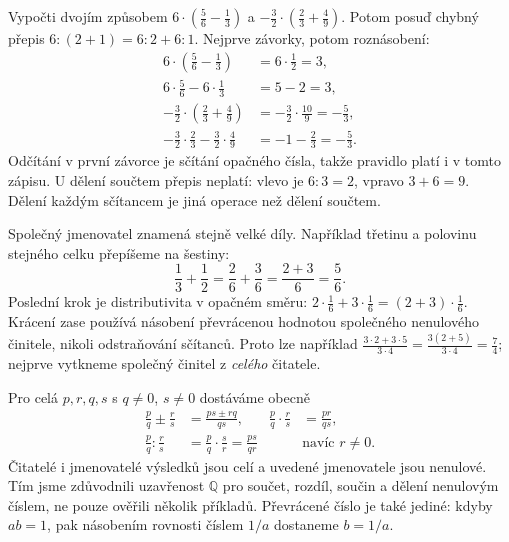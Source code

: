 \documentclass[11pt,a4paper]{article}
\begin{document}
\begin{prikladReseniBox}[title={Příklad 4},breakable=false]
Vypočti dvojím způsobem $6\cdot(\frac56-\frac13)$ a
$-\frac32\cdot(\frac23+\frac49)$. Potom posuď chybný přepis
$6:(2+1)=6:2+6:1$.
\tcblower
Nejprve závorky, potom roznásobení:
\begin{align*}
6\cdot\left(\frac56-\frac13\right)&=6\cdot\frac12=3,\\
6\cdot\frac56-6\cdot\frac13&=5-2=3,\\
-\frac32\cdot\left(\frac23+\frac49\right)&=-\frac32\cdot\frac{10}{9}=-\frac53,\\
-\frac32\cdot\frac23-\frac32\cdot\frac49&=-1-\frac23=-\frac53.
\end{align*}
Odčítání v první závorce je sčítání opačného čísla, takže pravidlo platí
i v tomto zápisu. U dělení součtem přepis neplatí: vlevo je $6:3=2$,
vpravo $3+6=9$. Dělení každým sčítancem je jiná operace než dělení součtem.
\end{prikladReseniBox}


Společný jmenovatel znamená stejně velké díly. Například třetinu
a polovinu stejného celku přepíšeme na šestiny:
\[
\frac13+\frac12=\frac26+\frac36=\frac{2+3}{6}=\frac56.
\]
Poslední krok je distributivita v opačném směru:
$2\cdot\frac16+3\cdot\frac16=(2+3)\cdot\frac16$.
Krácení zase používá násobení převrácenou hodnotou společného
nenulového činitele, nikoli odstraňování sčítanců.
Proto lze například
$\frac{3\cdot2+3\cdot5}{3\cdot4}
=\frac{3(2+5)}{3\cdot4}=\frac74$;
nejprve vytkneme společný činitel z \emph{celého} čitatele.

Pro celá $p,r,q,s$ s $q\ne0$, $s\ne0$ dostáváme obecně
\begin{align*}
\frac pq\mathbin{\pm}\frac rs&=\frac{ps\pm rq}{qs},
&\frac pq\cdot\frac rs&=\frac{pr}{qs},\\
\frac pq:\frac rs&=\frac pq\cdot\frac sr=\frac{ps}{qr}
&&\text{navíc }r\ne0.
\end{align*}
Čitatelé i jmenovatelé výsledků jsou celí a uvedené jmenovatele
jsou nenulové. Tím jsme zdůvodnili uzavřenost $\mathbb Q$ pro součet,
rozdíl, součin a dělení nenulovým číslem, ne pouze ověřili několik příkladů.
Převrácené číslo je také jediné: kdyby $ab=1$, pak násobením
rovnosti číslem $1/a$ dostaneme $b=1/a$.
\end{document}
